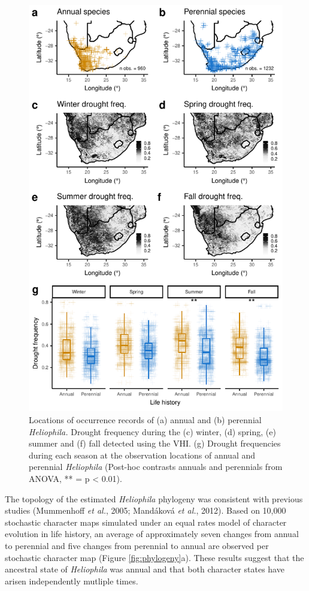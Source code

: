 \documentclass[man,floatsintext]{apa6}
\theoremstyle{definition}
\theoremstyle{definition}
\theoremstyle{definition}
\theoremstyle{remark}
\begin{document}
\begin{figure}[!h]
\includegraphics[width=\textwidth]{../figures/maps_boxplots} \caption{Locations of occurrence records of (a) annual and (b)
perennial \emph{Heliophila.} Drought frequency during the (c) winter,
(d) spring, (e) summer and (f) fall detected using the VHI. (g) Drought
frequencies during each season at the observation locations of annual
and perennial \emph{Heliophila} (Post-hoc contrasts annuals and
perennials from ANOVA, ** = p \textless{} 0.01).}\label{fig:mapsboxplots}
\end{figure}

The topology of the estimated \emph{Heliophila} phylogeny was consistent
with previous studies (Mummenhoff \emph{et al.}, 2005; Mandáková
\emph{et al.}, 2012). Based on 10,000 stochastic character maps
simulated under an equal rates model of character evolution in life
history, an average of approximately seven changes from annual to
perennial and five changes from perennial to annual are observed per
stochastic character map (Figure \ref{fig:phylogeny}a). These results
suggest that the ancestral state of \emph{Heliophila} was annual and
that both character states have arisen independently mutliple times.
\end{document}
